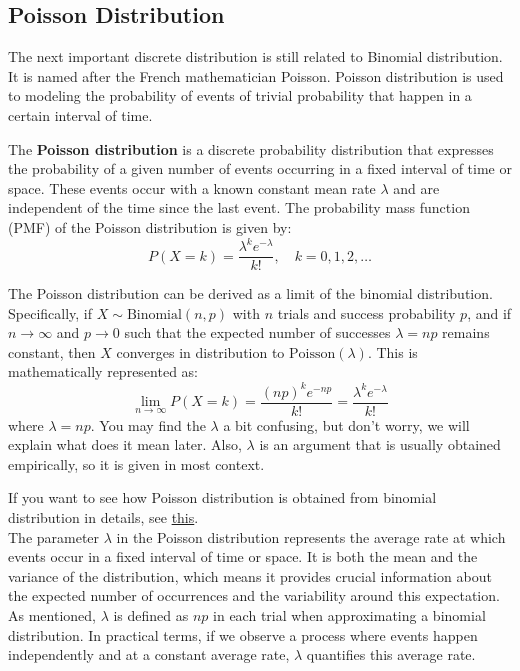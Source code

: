 \subsection{Poisson Distribution}
The next important discrete distribution is still related to Binomial distribution. It is named after the French mathematician Poisson. Poisson distribution is used to modeling the probability of events of trivial probability that happen in a certain interval of time.
\begin{definition}
The \textbf{Poisson distribution} is a discrete probability distribution that expresses the probability of a given number of events occurring in a fixed interval of time or space. These events occur with a known constant mean rate $\lambda$ and are independent of the time since the last event. The probability mass function (PMF) of the Poisson distribution is given by:
\[
P(X = k) = \frac{\lambda^k e^{-\lambda}}{k!}, \quad k = 0, 1, 2, \ldots
\]

The Poisson distribution can be derived as a limit of the binomial distribution. Specifically, if \(X \sim \text{Binomial}(n, p)\) with \(n\) trials and success probability \(p\), and if \(n \to \infty\) and \(p \to 0\) such that the expected number of successes \(\lambda = np\) remains constant, then \(X\) converges in distribution to \( \text{Poisson}(\lambda) \). This is mathematically represented as:
\[
\lim_{n \to \infty} P(X = k) = \frac{(np)^k e^{-np}}{k!} = \frac{\lambda^k e^{-\lambda}}{k!}
\]
where \(\lambda = np\). You may find the $\lambda$ a bit confusing, but don't worry, we will explain what does it mean later. Also, $\lambda$ is an argument that is usually obtained empirically, so it is given in most context.
\end{definition}

\begin{remark}
    If you want to see how Poisson distribution is obtained from binomial distribution in details, see \href{https://medium.com/@andrew.chamberlain/deriving-the-poisson-distribution-from-the-binomial-distribution-840cc1668239}{this}.
    \\
    The parameter \(\lambda\) in the Poisson distribution represents the average rate at which events occur in a fixed interval of time or space. It is both the mean and the variance of the distribution, which means it provides crucial information about the expected number of occurrences and the variability around this expectation. As mentioned, \(\lambda\) is defined as $np$ in each trial when approximating a binomial distribution. In practical terms, if we observe a process where events happen independently and at a constant average rate, \(\lambda\) quantifies this average rate. 
\end{remark}

